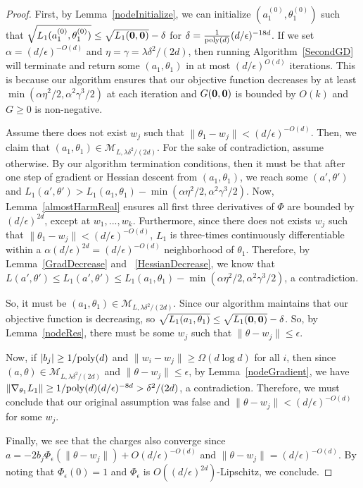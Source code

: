 \begin{proof}
First, by Lemma~\ref{nodeInitialize},  we can initialize ${(a_1^{(0)},\theta_1^{(0)})}$ such that $\sqrt{L_1({a_1^{(0)},\theta_1^{(0)}})} \leq \sqrt{ L_1({\bf 0,0})} - \delta$ for $ \delta = \frac{1}{\mathrm{poly}(d)}(d/\epsilon)^{ -18d}$. If we set $\alpha = (d/\epsilon)^{-O(d)}$ and $\eta = \gamma = \lambda \delta^2/(2d)$,  then running Algorithm~\ref{SecondGD} will terminate and return some $(a_1,\theta_1)$ in at most $(d/\epsilon)^{O(d)}$ iterations. This is because our algorithm ensures that our objective function decreases by at least $\min(\alpha \eta^2/2, \alpha^2\gamma^3/2)$ at each iteration and $G({\bf 0, 0})$ is bounded by $O(k)$ and $G \geq 0$ is non-negative.

Assume there does not exist $w_j$ such that $\|\theta_1 - w_j\| < (d/\epsilon)^{-O(d)}$. Then, we claim that $(a_1,\theta_1) \in \mathcal{M}_{L,\lambda \delta^2/(2d)}$. For the sake of contradiction, assume otherwise. By our algorithm termination conditions, then it must be that after one step of gradient or Hessian descent from $(a_1,\theta_1)$, we reach some $(a',\theta')$ and $L_1(a',\theta') > L_1(a_1,\theta_1) - \min(\alpha\eta^2/2,\alpha^2\gamma^3/2)$. Now, Lemma~\ref{almostHarmReal} ensures all first three derivatives of $\Phi$ are bounded by $(d/\epsilon)^{2d}$, except at $w_1,...,w_k$. Furthermore, since there does not exists $w_j$ such that $\|\theta_1 - w_j\| < (d/\epsilon)^{-O(d)}$, $L_1$ is three-times continuously differentiable within a $\alpha (d/\epsilon)^{2d} = (d/\epsilon)^{-O(d)}$ neighborhood of $ \theta_1$. Therefore, by Lemma~\ref{GradDecrease} and ~\ref{HessianDecrease}, we know that $L(a',\theta') \leq L_1(a',\theta') \leq L_1(a_1,\theta_1) - \min(\alpha\eta^2/2,\alpha^2\gamma^3/2)$, a contradiction. 

So, it must be $(a_1,\theta_1) \in \mathcal{M}_{L,\lambda \delta^2/(2d)}$. Since our algorithm maintains that our objective function is decreasing, so $\sqrt{L_1({a_1,\theta_1})} \leq \sqrt{L_1({\bf 0,0})} - \delta $. So, by Lemma~\ref{nodeRes}, there must be some $w_j$ such that $\|\theta- w_j\|\leq \epsilon$.

Now, if $|b_j| \geq 1/\mathrm{poly}(d)$ and $\|w_i - w_j\| \geq \Omega(d\log d)$ for all $i$, then since $(a,\theta) \in \mathcal{M}_{L,\lambda \delta^2/(2d)}$ and $\|\theta - w_j \| \leq \epsilon$, by Lemma~\ref{nodeGradient}, we have $\|\nabla_{\theta_1}L_1 \| \geq 1/\mathrm{poly}(d)(d/\epsilon)^{-8d} > \delta^2/(2d)$, a contradiction. Therefore, we must conclude that our original assumption was false and $\|\theta - w_j\| < (d/\epsilon)^{-O(d)}$ for some $w_j$.

Finally, we see that the charges also converge since $a = -2b_j \Phi_\epsilon(\|\theta - w_j\|) + O(d/\epsilon)^{-O(d)}$ and $\|\theta - w_j\| = (d/\epsilon)^{-O(d)}$. By noting that $\Phi_\epsilon(0) = 1$ and $\Phi_\epsilon$ is $O((d/\epsilon)^{2d})$-Lipschitz, we conclude. 
\end{proof}


